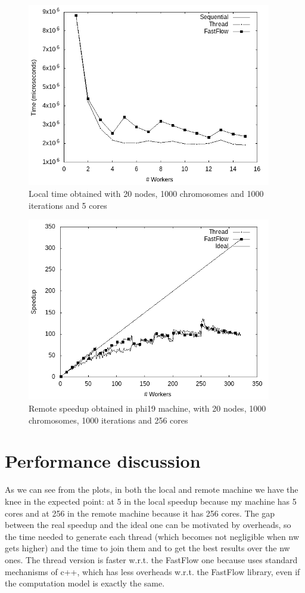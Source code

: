 \documentclass{article}
\begin{document}
    \begin{figure}
        \includegraphics[width=\linewidth, height=8cm]{img/local_time.png}
        \caption{Local time obtained with 20 nodes, 1000 chromosomes and 1000 iterations and 5 cores}
        \label{fig:localt}
    \end{figure}

    \begin{figure}
        \includegraphics[width=\linewidth, height=8cm]{img/remote_speedup.png}
        \caption{Remote speedup obtained in phi19 machine, with 20 nodes, 1000 chromosomes, 1000 iterations and 256 cores}
        \label{fig:remotes}
    \end{figure}

    \section{Performance discussion}
	As we can see from the plots, in both the local and remote machine we have the knee in the expected point: at 5 in the local speedup because my machine has 5 cores and at 256 in the remote machine because it has 256 cores. The gap between the real speedup and the ideal one can be motivated by overheads, so the time needed to generate each thread (which becomes not negligible when nw gets higher) and the time to join them and to get the best results over the nw ones. The thread version is faster w.r.t. the FastFlow one because uses standard mechanisms of c++, which has less overheads w.r.t. the FastFlow library, even if the computation model is exactly the same.
\end{document}

